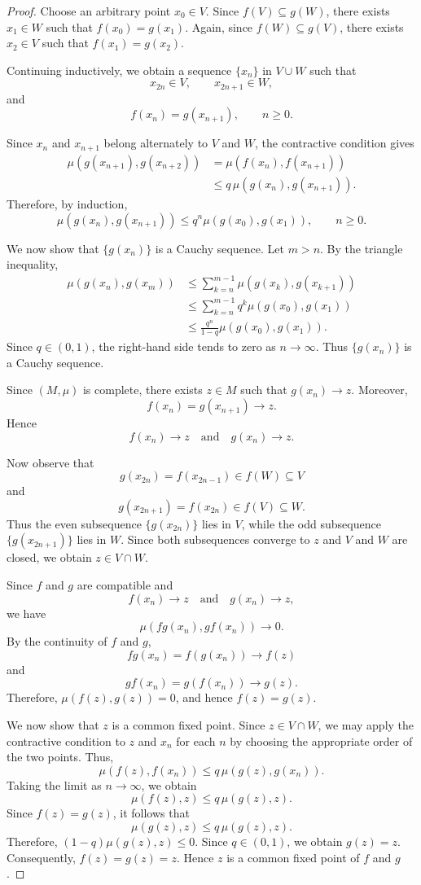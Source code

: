 \documentclass[10pt,a4paper]{amsart}
\begin{document}
\begin{proof}
Choose an arbitrary point $x_0\in V$. Since $f(V)\subseteq g(W)$, 
there exists $x_1\in W$ such that $f(x_0)=g(x_1)$. Again, since $f(W)\subseteq g(V)$, 
there exists $x_2\in V$ such that $f(x_1)=g(x_2)$. 

Continuing inductively, we obtain a sequence $\{x_n\}$ in $V\cup W$
such that
\[
x_{2n}\in V,\qquad x_{2n+1}\in W,
\]
and
\[
f(x_n)=g(x_{n+1}),
\qquad n\geq0.
\]

Since $x_n$ and $x_{n+1}$ belong alternately to $V$ and $W$, the
contractive condition gives
\[
\begin{aligned}
\mu(g(x_{n+1}),g(x_{n+2}))
&=
\mu(f(x_n),f(x_{n+1}))\\
&\leq
q\,\mu(g(x_n),g(x_{n+1})).
\end{aligned}
\]
Therefore, by induction,
\[
\mu(g(x_n),g(x_{n+1}))
\leq
q^n\mu(g(x_0),g(x_1)),
\qquad n\geq0.
\]

We now show that $\{g(x_n)\}$ is a Cauchy sequence. Let $m>n$. By the
triangle inequality,
\[
\begin{aligned}
\mu(g(x_n),g(x_m))
&\leq
\sum_{k=n}^{m-1}
\mu(g(x_k),g(x_{k+1}))\\
&\leq
\sum_{k=n}^{m-1}
q^k\mu(g(x_0),g(x_1))\\
&\leq
\frac{q^n}{1-q}\mu(g(x_0),g(x_1)).
\end{aligned}
\]
Since $q\in(0,1)$, the right-hand side tends to zero as $n\to\infty$.
Thus $\{g(x_n)\}$ is a Cauchy sequence.

Since $(M,\mu)$ is complete, there exists $z\in M$ such that $g(x_n)\longrightarrow z$. Moreover,
\[
f(x_n)=g(x_{n+1})\longrightarrow z.
\]
Hence
\[
f(x_n)\longrightarrow z
\quad\text{and}\quad
g(x_n)\longrightarrow z.
\]

Now observe that
\[
g(x_{2n})=f(x_{2n-1})\in f(W)\subseteq V
\]
and
\[
g(x_{2n+1})=f(x_{2n})\in f(V)\subseteq W.
\]
Thus the even subsequence $\{g(x_{2n})\}$ lies in $V$, while the odd
subsequence $\{g(x_{2n+1})\}$ lies in $W$. Since both subsequences
converge to $z$ and $V$ and $W$ are closed, we obtain $z\in V\cap W$. 

Since $f$ and $g$ are compatible and
\[
f(x_n)\longrightarrow z
\quad\text{and}\quad
g(x_n)\longrightarrow z,
\]
we have
\[
\mu(fg(x_n),gf(x_n))\longrightarrow0.
\]
By the continuity of $f$ and $g$,
\[
fg(x_n)=f(g(x_n))\longrightarrow f(z)
\]
and
\[
gf(x_n)=g(f(x_n))\longrightarrow g(z).
\]
Therefore, $\mu(f(z),g(z))=0$, 
and hence $f(z)=g(z)$. 

We now show that $z$ is a common fixed point. Since $z\in V\cap W$, we
may apply the contractive condition to $z$ and $x_n$ for each $n$ by
choosing the appropriate order of the two points. Thus,
\[
\mu(f(z),f(x_n))
\leq
q\,\mu(g(z),g(x_n)).
\]
Taking the limit as $n\to\infty$, we obtain
\[
\mu(f(z),z)
\leq
q\,\mu(g(z),z).
\]
Since $f(z)=g(z)$, it follows that
\[
\mu(g(z),z)
\leq
q\,\mu(g(z),z).
\]
Therefore, $(1-q)\mu(g(z),z)\leq0$. 
Since $q\in(0,1)$, we obtain $g(z)=z$. 
Consequently, $f(z)=g(z)=z$. Hence $z$ is a common fixed point of $f$ and $g$.


\end{proof}
\end{document}
